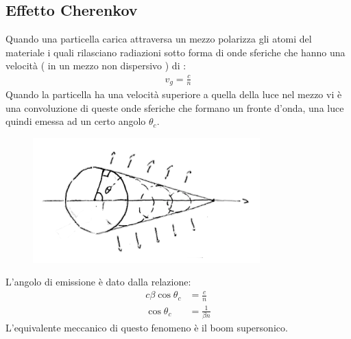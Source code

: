 \subsection{Effetto Cherenkov}
Quando una particella carica attraversa un mezzo polarizza gli atomi del materiale i quali rilasciano
radiazioni sotto forma di onde sferiche che hanno una velocità ( in un mezzo non dispersivo ) di :
\begin{align*}
        v_{g} = \frac{c}{n} \tag*{n è indice di rifrazione}
\end{align*}
\newpage
Quando la particella ha una velocità superiore a quella della luce nel mezzo vi è una convoluzione di queste onde sferiche che formano
un fronte d'onda, una luce quindi emessa ad un certo angolo $\theta_{c}$.
\begin{figure}[!h]
    \centering
    \includegraphics[scale=0.8]{ch6InterazioneMateria/Cherenkov}
\end{figure}

L'angolo di emissione è dato dalla relazione: 
\begin{align*}
        c\beta\cos{\theta_{c}} &= \frac{c}{n} \\[1em]
    \cos{\theta_{c}} &= \frac{1}{\beta n}
\end{align*}
L'equivalente meccanico di questo fenomeno è il boom supersonico.
